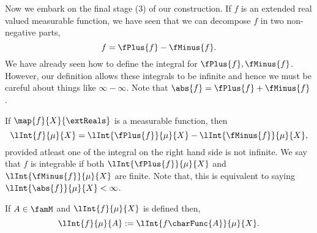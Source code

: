 Now we embark on the final stage ($3$) of our construction. If $f$ is an extended real valued measurable
function, we have seen that we can decompose $f$ in two non-negative parts,
\[f = \fPlus{f} - \fMinus{f}.\]
We have already seen how to define the integral for $\fPlus{f},\fMinus{f}$. However, our definition allows
these integrals to be infinite and hence we must be careful about things like $\infty - \infty$. Note that
$\abs{f} = \fPlus{f} +\fMinus{f}$. 
\begin{Definition}
    If $\map{f}{X}{\extReals}$ is a measurable function, then
    \begin{equation}\label{eq:int_meas_func}
	\lInt{f}{\mu}{X} = \lInt{\fPlus{f}}{\mu}{X} - \lInt{\fMinus{f}}{\mu}{X},
    \end{equation}
    provided atleast one of the integral on the right hand side is not infinite. We say that $f$ is integrable
    if both $\lInt{\fPlus{f}}{\mu}{X}$ and $\lInt{\fMinus{f}}{\mu}{X}$ are finite. 
    Note that, this is equivalent to saying $\lInt{\abs{f}}{\mu}{X} < \infty$.
\end{Definition}
If $A \in \famM$ and $\lInt{f}{\mu}{X}$ is defined then,
\[\lInt{f}{\mu}{A} := \lInt{f\charFunc{A}}{\mu}{X}.\]

